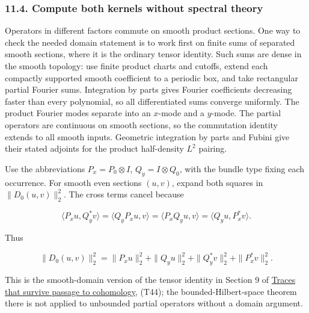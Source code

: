 \documentclass[
  11pt,
]{article}
\makeatletter
\let\ReaderOriginalAnchorStart\hyper@anchorstart
\let\ReaderOriginalAnchorEnd\hyper@anchorend
\let\ReaderPendingAliases\@empty
\def\ReaderArmAliases#1{\gdef\ReaderPendingAliases{#1}}
\def\hyper@anchorstart#1{\ReaderIfNativeAnchorTF{#1}{\ReaderPendingAliases\global\let\ReaderPendingAliases\@empty}{}\ReaderOriginalAnchorStart{#1}}
\makeatother
\begin{document}
\ReaderArmAliases{\ReaderOriginalAnchorStart{pp-f-compute-the-kernels-without-spectral-theory}\ReaderOriginalAnchorEnd\begingroup\expandafter\def\csname @currentHref\endcsname{pp-f-compute-the-kernels-without-spectral-theory}\label{pp-f-compute-the-kernels-without-spectral-theory}\endgroup\ReaderOriginalAnchorStart{11-4-compute-both-kernels-without-spectral-theory}\ReaderOriginalAnchorEnd\begingroup\expandafter\def\csname @currentHref\endcsname{11-4-compute-both-kernels-without-spectral-theory}\label{11-4-compute-both-kernels-without-spectral-theory}\endgroup}
\subsubsection{11.4. Compute both kernels without spectral
theory}\label{compute-both-kernels-without-spectral-theory}

Operators in different factors commute on smooth product sections. One
way to check the needed domain statement is to work first on finite sums
of separated smooth sections, where it is the ordinary tensor identity.
Such sums are dense in the smooth topology: use finite product charts
and cutoffs, extend each compactly supported smooth coefficient to a
periodic box, and take rectangular partial Fourier sums. Integration by
parts gives Fourier coefficients decreasing faster than every
polynomial, so all differentiated sums converge uniformly. The product
Fourier modes separate into an \(x\)-mode and a \(y\)-mode. The partial
operators are continuous on smooth sections, so the commutation identity
extends to all smooth inputs. Geometric integration by parts and Fubini
give their stated adjoints for the product half-density \(L^2\) pairing.

Use the abbreviations \(P_x=P_0\otimes I\), \(Q_y=I\otimes Q_0\), with
the bundle type fixing each occurrence. For smooth even sections
\((u,v)\), expand both squares in \(\|D_0(u,v)\|_2^2\). The cross terms
cancel because

\[
 \langle P_xu,Q_y^*v\rangle
   =\langle Q_yP_xu,v\rangle
   =\langle P_xQ_yu,v\rangle
   =\langle Q_yu,P_x^*v\rangle.
\]

Thus

\[
 \|D_0(u,v)\|_2^2
  =\|P_xu\|_2^2+\|Q_yu\|_2^2
        +\|Q_y^*v\|_2^2+\|P_x^*v\|_2^2.
 \tag{I60}
\]

This is the smooth-domain version of the tensor identity in Section 9 of
\href{traces-and-complexes.pdf}{Traces that survive passage to
cohomology}, (T44); the bounded-Hilbert-space theorem there is not
applied to unbounded partial operators without a domain argument.
\end{document}

